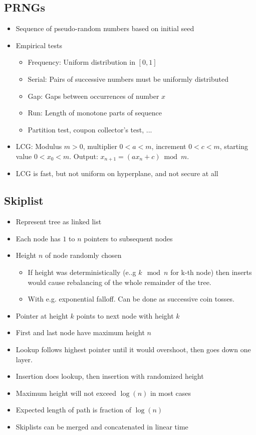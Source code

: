 \documentclass[a4paper]{scrreprt}
\begin{document}
\subsection{PRNGs}

\begin{itemize}
		\item Sequence of pseudo-random numbers based on initial seed
		\item Empirical tests
				\begin{itemize}
						\item Frequency: Uniform distribution in $[0, 1]$
						\item Serial: Pairs of successive numbers must be
								uniformly distributed
						\item Gap: Gaps between occurrences of number $x$
						\item Run: Length of monotone parts of sequence
						\item Partition test, coupon collector's test, ...
				\end{itemize}
		\item LCG: Modulus $m > 0$, multiplier $0 < a < m$, increment $0 < c <
				m$, starting value $0 < x_0 < m$. Output: $x_{n+1} = (a x_n +
				c) \bmod m$.
		\item LCG is fast, but not uniform on hyperplane, and not secure at all
\end{itemize}

\subsection{Skiplist}

\begin{itemize}
		\item Represent tree as linked list
		\item Each node has $1$ to $n$ pointers to subsequent nodes
		\item Height $n$ of node randomly chosen
				\begin{itemize}
						\item If height was deterministically (e..g $k \mod n$
								for k-th node) then inserts would cause
								rebalancing of the whole remainder of the tree.
						\item With e.g. exponential falloff. Can be done as
								successive coin tosses.
				\end{itemize}
		\item Pointer at height $k$ points to next node with height $k$
		\item First and last node have maximum height $n$
		\item Lookup follows highest pointer until it would overshoot, then
				goes down one layer.
		\item Insertion does lookup, then insertion with randomized height
		\item Maximum height will not exceed $\log(n)$ in most cases
		\item Expected length of path is fraction of $\log(n)$
		\item Skiplists can be merged and concatenated in linear time
\end{itemize}
\end{document}
